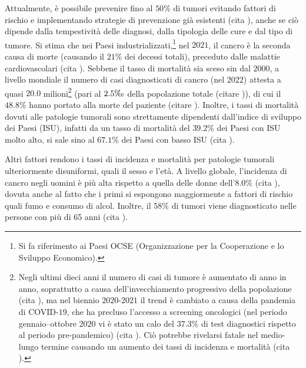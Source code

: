 \documentclass[12pt,a4paper,twoside]{report}
\begin{document}
	Attualmente, è possibile prevenire fino al $50\%$ di tumori evitando fattori di rischio e implementando strategie di prevenzione già esistenti (cita
	), anche se ciò dipende dalla tempestività delle diagnosi, dalla tipologia delle cure e dal tipo di tumore. Si stima che nei Paesi industrializzati,\footnote{Si fa riferimento ai Paesi OCSE (Organizzazione per la Cooperazione e lo Sviluppo Economico).} nel $2021$, il cancro è la seconda causa di morte (causando il $21\%$ dei decessi totali), preceduto dalle malattie cardiovascolari (cita %
	). Sebbene il tasso di mortalità sia sceso sin dal $2000$, a livello mondiale il numero di casi diagnosticati di cancro (nel $2022$) attesta a quasi $20.0$ milioni\footnote{Negli ultimi dieci anni il numero di casi di tumore è aumentato di anno in anno, soprattutto a causa dell'invecchiamento progressivo della popolazione (cita
	), ma nel biennio $2020$-$2021$ il trend è cambiato a causa della pandemia di COVID-$19$, che ha precluso l'accesso a screening oncologici (nel periodo gennaio--ottobre $2020$ vi è stato un calo del $37.3\%$ di test diagnostici rispetto al periodo pre-pandemico) (cita
	). Ciò potrebbe rivelarsi fatale nel medio-lungo termine causando un aumento dei tassi di incidenza e mortalità (cita
	).} (pari al $2.5\tcperthousand$ della popolazione totale (citare %
	)), di cui il $48.8\%$ hanno portato alla morte del paziente (citare
	). Inoltre, i tassi di mortalità dovuti alle patologie tumorali sono strettamente dipendenti dall'indice di sviluppo dei Paesi (ISU), infatti da un tasso di mortalità del $39.2\%$ dei Paesi con ISU molto alto, si sale sino al $67.1\%$ dei Paesi con basso ISU (cita
	).
	
	Altri fattori rendono i tassi di incidenza e mortalità per patologie tumorali ulteriormente disuniformi, quali il sesso e l'età. A livello globale, l'incidenza di cancro negli uomini è più alta rispetto a quella delle donne dell'$8.0\%$ (cita
	), dovuta anche al fatto che i primi si espongono maggiormente a fattori di rischio quali fumo e consumo di alcol. Inoltre, il $58\%$ di tumori viene diagnosticato nelle persone con più di 65 anni (cita
	).
	
\end{document}
